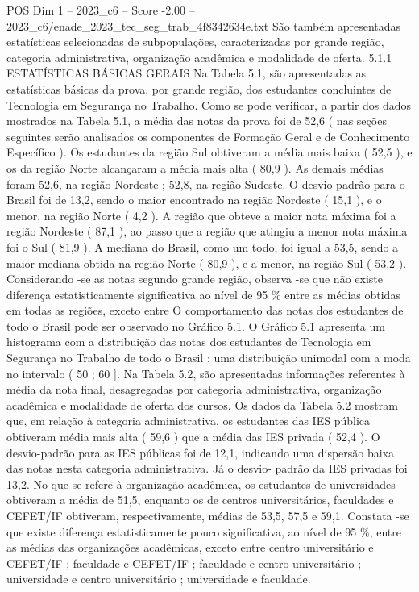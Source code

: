\begin{textsample}{POS Dim 1 – 2023\_c6 – Score -2.00 – 2023\_c6/enade\_2023\_tec\_seg\_trab\_4f8342634e.txt}
São também apresentadas estatísticas selecionadas de subpopulações, caracterizadas por grande região, categoria administrativa, organização acadêmica e modalidade de oferta. 5.1.1 ESTATÍSTICAS BÁSICAS GERAIS Na Tabela 5.1, são apresentadas as estatísticas básicas da prova, por grande região, dos estudantes concluintes de Tecnologia em Segurança no Trabalho.
Como se pode verificar, a partir dos dados mostrados na Tabela 5.1, a média das notas da prova foi de 52,6 ( nas seções seguintes serão analisados os componentes de Formação Geral e de Conhecimento Específico ).
Os estudantes da região Sul obtiveram a média mais baixa ( 52,5 ), e os da região Norte alcançaram a média mais alta ( 80,9 ).
As demais médias foram 52,6, na região Nordeste ; 52,8, na região Sudeste.
O desvio-padrão para o Brasil foi de 13,2, sendo o maior encontrado na região Nordeste ( 15,1 ), e o menor, na região Norte ( 4,2 ).
A região que obteve a maior nota máxima foi a região Nordeste ( 87,1 ), ao passo que a região que atingiu a menor nota máxima foi o Sul ( 81,9 ).
A mediana do Brasil, como um todo, foi igual a 53,5, sendo a maior mediana obtida na região Norte ( 80,9 ), e a menor, na região Sul ( 53,2 ).
Considerando -se as notas segundo grande região, observa -se que não existe diferença estatisticamente significativa ao nível de 95 \% entre as médias obtidas em todas as regiões, exceto entre O comportamento das notas dos estudantes de todo o Brasil pode ser observado no Gráfico 5.1.
O Gráfico 5.1 apresenta um histograma com a distribuição das notas dos estudantes de Tecnologia em Segurança no Trabalho de todo o Brasil : uma distribuição unimodal com a moda no intervalo ( 50 ; 60 ].
Na Tabela 5.2, são apresentadas informações referentes à média da nota final, desagregadas por categoria administrativa, organização acadêmica e modalidade de oferta dos cursos.
Os dados da Tabela 5.2 mostram que, em relação à categoria administrativa, os estudantes das IES pública obtiveram média mais alta ( 59,6 ) que a média das IES privada ( 52,4 ).
O desvio-padrão para as IES públicas foi de 12,1, indicando uma dispersão baixa das notas nesta categoria administrativa.
Já o desvio- padrão da IES privadas foi 13,2.
No que se refere à organização acadêmica, os estudantes de universidades obtiveram a média de 51,5, enquanto os de centros universitários, faculdades e CEFET/IF obtiveram, respectivamente, médias de 53,5, 57,5 e 59,1.
Constata -se que existe diferença estatisticamente pouco significativa, ao nível de 95 \%, entre as médias das organizações acadêmicas, exceto entre centro universitário e CEFET/IF ; faculdade e CEFET/IF ; faculdade e centro universitário ; universidade e centro universitário ; universidade e faculdade.

\end{textsample}
